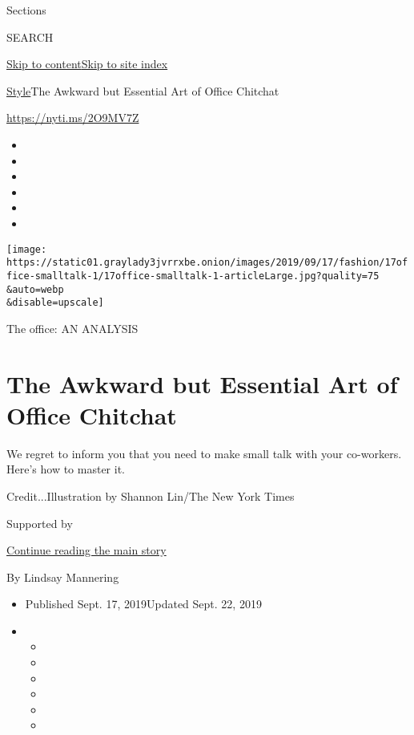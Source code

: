 Sections

SEARCH

\protect\hyperlink{site-content}{Skip to
content}\protect\hyperlink{site-index}{Skip to site index}

\href{/section/style}{Style}\textbar{}The Awkward but Essential Art of
Office Chitchat

\href{https://nyti.ms/2O9MV7Z}{https://nyti.ms/2O9MV7Z}

\begin{itemize}
\item
\item
\item
\item
\item
\item
\end{itemize}

\texttt{[image: https://static01.graylady3jvrrxbe.onion/images/2019/09/17/fashion/17office-smalltalk-1/17office-smalltalk-1-articleLarge.jpg?quality=75\\\&auto=webp\\\&disable=upscale]}

The office: AN ANALYSIS

\hypertarget{the-awkward-but-essential-art-of-office-chitchat}{%
\section{The Awkward but Essential Art of Office
Chitchat}\label{the-awkward-but-essential-art-of-office-chitchat}}

We regret to inform you that you need to make small talk with your
co-workers. Here's how to master it.

Credit...Illustration by Shannon Lin/The New York Times

Supported by

\protect\hyperlink{after-sponsor}{Continue reading the main story}

By Lindsay Mannering

\begin{itemize}
\item
  Published Sept. 17, 2019Updated Sept. 22, 2019
\item
  \begin{itemize}
  \item
  \item
  \item
  \item
  \item
  \item
  \end{itemize}
\end{itemize}

